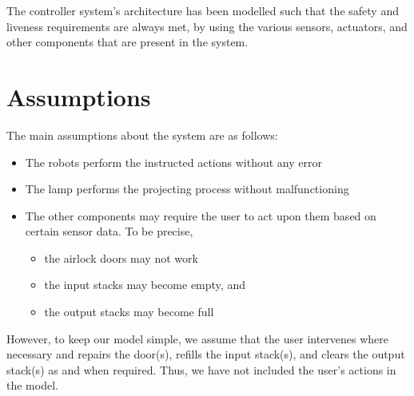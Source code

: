 
The controller system’s architecture has been modelled such that the safety and liveness requirements are always met, by using the various sensors, actuators, and other components that are present in the system.

\section{Assumptions} 
The main assumptions about the system are as follows:
\begin{itemize}
    \item The robots perform the instructed actions without any error
    \item The lamp performs the projecting process without malfunctioning
    \item The other components may require the user to act upon them based on certain sensor data. To be precise,
    \begin{itemize}
        \item the airlock doors may not work
        \item the input stacks may become empty, and 
        \item the output stacks may become full
    \end{itemize}
\end{itemize}

However, to keep our model simple, we assume that the user intervenes where necessary and repairs the door(s), refills the input stack(s), and clears the output stack(s) as and when required. Thus, we have not included the user's actions in the model.


